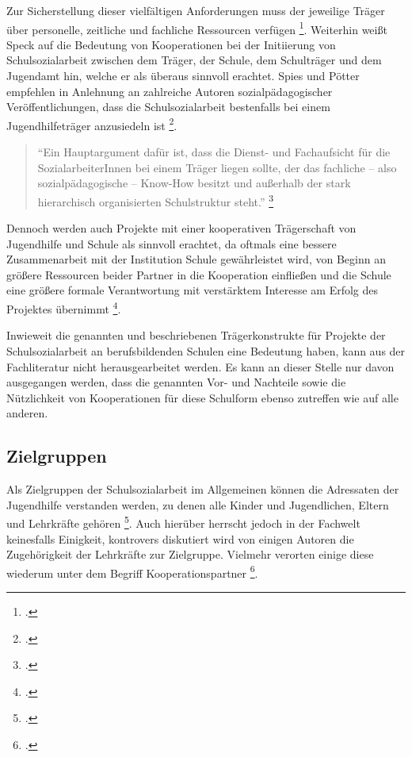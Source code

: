 \noindent
Zur Sicherstellung dieser vielfältigen Anforderungen muss der jeweilige Träger über personelle, zeitliche und fachliche Ressourcen verfügen \footcite[vgl.]{BIVSD2013}. Weiterhin weißt Speck auf die Bedeutung von Kooperationen bei der Initiierung von Schulsozialarbeit zwischen dem Träger, der Schule, dem Schulträger und dem Jugendamt hin, welche er als überaus sinnvoll erachtet. Spies und Pötter empfehlen in Anlehnung an zahlreiche Autoren sozialpädagogischer Veröffentlichungen, dass die Schulsozialarbeit bestenfalls bei einem Jugendhilfeträger anzusiedeln ist \footcite[64]{Spies2011}. 

\begin{quotation}
\noindent
"`Ein Hauptargument dafür ist, dass die Dienst- und Fachaufsicht für die SozialarbeiterInnen bei einem Träger liegen sollte, der das fachliche -- also sozialpädagogische -- Know-How besitzt und außerhalb der stark hierarchisch organisierten Schulstruktur steht."' \footcite[64]{Spies2011}
\end{quotation}

\noindent
Dennoch werden auch Projekte mit einer kooperativen Trägerschaft von Jugendhilfe und Schule als sinnvoll erachtet, da oftmals eine bessere Zusammenarbeit mit der Institution Schule gewährleistet wird, von Beginn an größere Ressourcen beider Partner in die Kooperation einfließen und die Schule eine größere formale Verantwortung mit verstärktem Interesse am Erfolg des Projektes übernimmt \footcite[vgl.][64]{Spies2011}.

Inwieweit die genannten und beschriebenen Trägerkonstrukte für Projekte der Schulsozialarbeit  an berufsbildenden Schulen eine Bedeutung haben, kann aus der Fachliteratur nicht herausgearbeitet werden. Es kann an dieser Stelle nur davon ausgegangen werden, dass die genannten Vor- und Nachteile sowie die Nützlichkeit von Kooperationen für diese Schulform ebenso zutreffen wie auf alle anderen. 

\subsection{Zielgruppen}
\label{sec:Zielgruppen}

Als Zielgruppen der Schulsozialarbeit im Allgemeinen können die Adressaten der Jugendhilfe verstanden werden, zu denen alle Kinder und Jugendlichen, Eltern und Lehrkräfte gehören \footcite[vgl.][31]{Speck2007}. Auch hierüber herrscht jedoch in der Fachwelt keinesfalls Einigkeit, kontrovers diskutiert wird von einigen Autoren die Zugehörigkeit der Lehrkräfte zur Zielgruppe. Vielmehr verorten einige diese wiederum unter dem Begriff Kooperationspartner \footcite[vgl.][50]{Spies2011}. 

